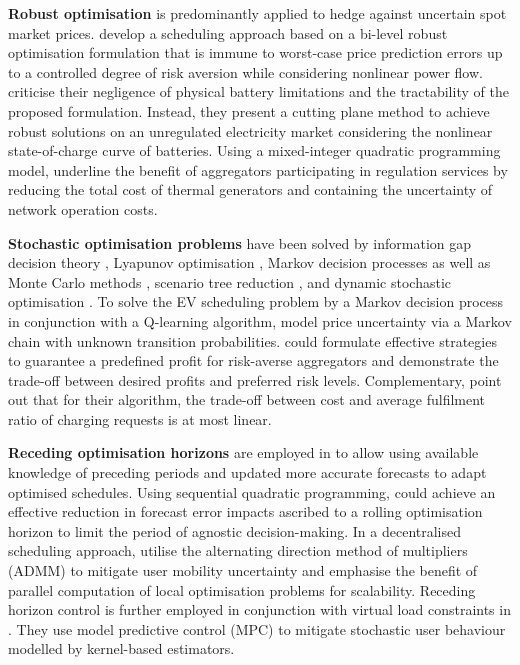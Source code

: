 \textbf{Robust optimisation} is predominantly applied to hedge against uncertain spot market prices. \cite{Soroudi2014} develop a scheduling approach based on a bi-level robust optimisation formulation that is immune to worst-case price prediction errors up to a controlled degree of risk aversion while considering nonlinear power flow. \cite{Korolko2015} criticise their negligence of physical battery limitations and the tractability of the proposed formulation. Instead, they present a cutting plane method to achieve robust solutions on an unregulated electricity market considering the nonlinear state-of-charge curve of batteries. Using a mixed-integer quadratic programming model, \cite{Bai2015} underline the benefit of aggregators participating in regulation services by reducing the total cost of thermal generators and containing the uncertainty of network operation costs.

\textbf{Stochastic optimisation problems} have been solved by information gap decision theory \cite{Zhao2015, Al-Awami2012}, Lyapunov optimisation \cite{Zhou2017}, Markov decision processes \cite{Zhang2014, Shi2011} as well as Monte Carlo methods \cite{Wu2017,Al-Awami2012}, scenario tree reduction \cite{Mehri2017}, and dynamic stochastic optimisation \cite{Liu2017}. To solve the EV scheduling problem by a Markov decision process in conjunction with a \mbox{Q-learning} algorithm, \cite{Shi2011} model price uncertainty via a Markov chain with unknown transition probabilities. \cite{Zhao2015} could formulate effective strategies to guarantee a predefined profit for risk-averse aggregators and demonstrate the trade-off between desired profits and preferred risk levels. Complementary, \cite{Zhou2017} point out that for their algorithm, the trade-off between cost and average fulfilment ratio of charging requests is at most linear.

\textbf{Receding optimisation horizons} are employed in \cite{Wang2017, Vaya2015, OConnell2014} to allow using available knowledge of preceding periods and updated more accurate forecasts to adapt optimised schedules. Using sequential quadratic programming, \cite{OConnell2014} could achieve an effective reduction in forecast error impacts ascribed to a rolling optimisation horizon to limit the period of agnostic decision-making. In a decentralised scheduling approach, \cite{Vaya2015} utilise the alternating direction method of multipliers (ADMM) to mitigate user mobility uncertainty and emphasise the benefit of parallel computation of local optimisation problems for scalability. Receding horizon control is further employed in conjunction with virtual load constraints in \cite{Wang2017}. They use model predictive control (MPC) to mitigate stochastic user behaviour modelled by kernel-based estimators.

